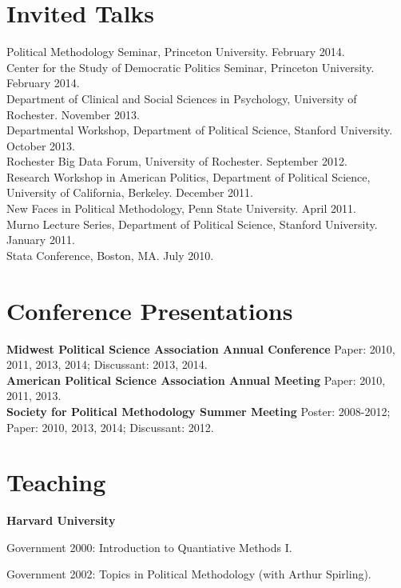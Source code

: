 \documentclass[margin,line]{res}
\newenvironment{list1}{
  \begin{list}{\ding{113}}{%
      \setlength{\itemsep}{0in}
      \setlength{\parsep}{0in} \setlength{\parskip}{0in}
      \setlength{\topsep}{0in} \setlength{\partopsep}{0in} 
      \setlength{\leftmargin}{0.83 cm}}}{\end{list}}
\begin{document}
\begin{resume}
\section{\textsf{\sc Invited Talks}}

Political Methodology Seminar, Princeton University. February 2014. \\
Center for the Study of Democratic Politics Seminar, Princeton University. February 2014.\\
Department of Clinical and Social Sciences in Psychology, University of Rochester. November 2013.\\
Departmental Workshop, Department of Political Science, Stanford University. October 2013.\\
Rochester Big Data Forum, University of Rochester. September 2012.\\
Research Workshop in American Politics, Department of Political Science, University of California, Berkeley. December 2011.\\
New Faces in Political Methodology, Penn State University. April 2011. \\
Murno Lecture Series, Department of Political Science, Stanford University. January 2011. \\
Stata Conference, Boston, MA. July 2010.

\section{\textsf{\sc Conference Presentations}}
{\bf Midwest Political Science Association Annual Conference} Paper: 2010, 2011, 2013, 2014; Discussant: 2013, 2014.\\
{\bf American Political Science Association Annual Meeting} Paper: 2010, 2011, 2013.\\
{\bf Society for Political Methodology Summer Meeting} Poster: 2008-2012; Paper: 2010, 2013, 2014; Discussant: 2012.\\

\section{\textsf{\sc Teaching}}
{\bf Harvard University}
\begin{list1}
\item[] Government 2000: Introduction to Quantiative Methods I.
\item[] Government 2002: Topics in Political Methodology (with Arthur Spirling).
\end{list1}


\end{resume}
\end{document}
